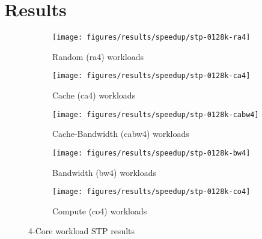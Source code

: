 
\chapter{Results}
\label{cpt:results}

\begin{figure}
    \centering
    \begin{subfigure}[b]{\textwidth}
            \texttt{[image: figures/results/speedup/stp-0128k-ra4]}
            \caption{Random (ra4) workloads}
            \label{fig:results:4core:stp:random}
    \end{subfigure}

    \begin{subfigure}[b]{0.5\textwidth}
            \texttt{[image: figures/results/speedup/stp-0128k-ca4]}
            \caption{Cache (ca4) workloads}
            \label{fig:results:4core:stp:cache}
    \end{subfigure}%
    \begin{subfigure}[b]{0.5\textwidth}
            \texttt{[image: figures/results/speedup/stp-0128k-cabw4]}
            \caption{Cache-Bandwidth (cabw4) workloads}
            \label{fig:results:4core:stp:cache-bw}
    \end{subfigure}

    \begin{subfigure}[b]{0.5\textwidth}
            \texttt{[image: figures/results/speedup/stp-0128k-bw4]}
            \caption{Bandwidth (bw4) workloads}
            \label{fig:results:4core:stp:bw}
    \end{subfigure}%
    \begin{subfigure}[b]{0.5\textwidth}
            \texttt{[image: figures/results/speedup/stp-0128k-co4]}
            \caption{Compute (co4) workloads}
            \label{fig:results:4core:stp:co}
    \end{subfigure}%

    \caption{4-Core workload STP results}\label{fig:results:4core:stp}
\end{figure}

